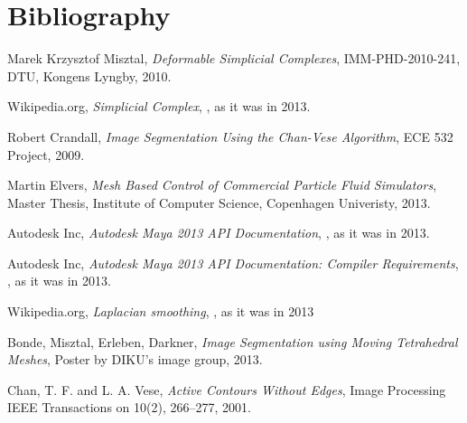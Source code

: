 \section{Bibliography}
\begin{thebibliography}{100}
Marek Krzysztof Misztal, \emph{Deformable Simplicial Complexes},
IMM-PHD-2010-241, DTU, Kongens Lyngby, 2010.


Wikipedia.org, \emph{Simplicial Complex},
, as it was in 2013.


Robert Crandall, \emph{Image Segmentation Using the Chan-Vese Algorithm},
ECE 532 Project, 2009.


Martin Elvers, \emph{Mesh Based Control of Commercial Particle Fluid Simulators},
Master Thesis, Institute of Computer Science, Copenhagen Univeristy, 2013.


Autodesk Inc, \emph{Autodesk Maya 2013 API Documentation},
,
as it was in 2013.

Autodesk Inc, \emph{Autodesk Maya 2013 API Documentation: Compiler Requirements},
,
as it was in 2013.

Wikipedia.org, \emph{Laplacian smoothing},
, as it was in 2013

Bonde, Misztal, Erleben, Darkner, \emph{Image Segmentation using Moving Tetrahedral Meshes},
Poster by DIKU's image group, 2013.

Chan, T. F. and L. A. Vese, \emph{Active Contours Without Edges}, Image Processing
IEEE Transactions on 10(2), 266–277, 2001.

\end{thebibliography}
